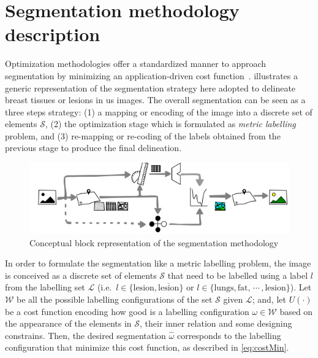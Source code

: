 \graphicspath{ {./content/method/figures/} }

\section{Segmentation methodology description} 

Optimization methodologies offer a standardized manner to approach segmentation by minimizing an application-driven cost function~\cite{cremers2007review}.
 illustrates a generic representation of the segmentation strategy here adopted to delineate breast tissues or lesions in \ac{us} images. 
The overall segmentation can be seen as a three steps strategy: 
(1) a mapping or encoding of the image into a discrete set of elements $\mathcal{S}$, 
(2) the optimization stage which is formulated as \emph{metric labelling} problem, 
and (3) re-mapping or re-coding of the labels obtained from the previous stage to produce the final delineation. 

\begin{figure}[htpb]
  \centering
  \includegraphics[width=0.9\linewidth]{method}
  \caption{Conceptual block representation of the segmentation methodology}
  \label{fig:method}
\end{figure}

In order to formulate the segmentation like a metric labelling problem, the image is conceived as a discrete set of elements $\mathcal{S}$ that need to be labelled using a label $l$ from the labelling set $\mathcal{L}$ 
(i.e.\, $l \in \{\text{lesion}, \overline{\text{lesion}}\}$ 
or $l \in \{\text{lungs}, \text{fat},\,\cdots\,, \text{lesion}\}$).
Let $\mathcal{W}$ be all the possible labelling configurations of the set $\mathcal{S}$ given $\mathcal{L}$; and, let $U(\cdot)$ be a cost function encoding how good is a labelling configuration $\omega \in \mathcal{W}$ based on the appearance of the elements in $\mathcal{S}$, their inner relation and some designing constrains.
Then, the desired segmentation $\hat{\omega}$ corresponds to the labelling configuration that minimize this cost function, as described in \cref{eq:costMin}.

